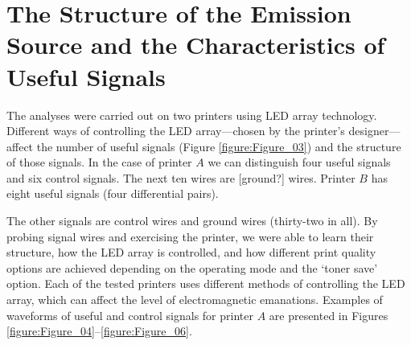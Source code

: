 \documentclass[10pt,a4paper]{article}
\begin{document}
\section{The Structure of the Emission Source and the Characteristics of
Useful Signals}

The analyses were carried out on two printers using LED array technology.
Different ways of controlling the LED array---chosen by the printer's
designer---affect the number of useful signals (Figure
\ref{figure:Figure_03}) and the structure of those signals. In the case of
printer $A$ we can distinguish four useful signals and six control
signals. The next ten wires are [ground?] wires. Printer $B$ has eight
useful signals (four differential pairs).

\begin{figure*}[ht]
    \centering
    \hfil
    \caption{Ribbon cable supplying useful signals to the LED array: (a)
        Printer $A$, (b) Printer $B$.}
    \label{figure:Figure_03}
\end{figure*}

The other signals are control wires and ground wires (thirty-two in all). By
probing signal wires and exercising the printer, we were able to learn their
structure, how the LED array is controlled, and how different print quality
options are achieved depending on the operating mode and the `toner save'
option. Each of the tested printers uses different methods of controlling the
LED array, which can affect the level of electromagnetic emanations. Examples
of waveforms of useful and control signals for printer $A$ are presented
in Figures \ref{figure:Figure_04}--\ref{figure:Figure_06}.

\begin{figure*}[ht]
    \centering
    \hfil
    \caption{Waveforms of useful signals on pins 2 (lower trace) and 5
        (upper trace) of printer $A$ for: a) the 300 dpi mode and the
        Best option, b) the 300 dpi mode and the Eco option.}

    \label{figure:Figure_04}
\end{figure*}
\end{document}
